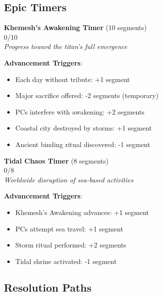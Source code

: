 \documentclass[11pt]{article}
\newcommand{\timersegment}{\textbullet}
\begin{document}
\subsection*{Epic Timers}

\begin{center}
\textbf{Khemesh's Awakening Timer } (10 segments)\\
\fbox{\timersegment\timersegment\timersegment\timersegment\timersegment\timersegment\timersegment\timersegment\timersegment\timersegment} 0/10\\
\textit{Progress toward the titan's full emergence}
\end{center}

\textbf{Advancement Triggers}:
\begin{itemize}[leftmargin=*]
\item Each day without tribute: +1 segment
\item Major sacrifice offered: -2 segments (temporary)
\item PCs interfere with awakening: +2 segments
\item Coastal city destroyed by storms: +1 segment
\item Ancient binding ritual discovered: -1 segment
\end{itemize}

\begin{center}
\textbf{Tidal Chaos Timer } (8 segments)\\
\fbox{\timersegment\timersegment\timersegment\timersegment\timersegment\timersegment\timersegment\timersegment} 0/8\\
\textit{Worldwide disruption of sea-based activities}
\end{center}

\textbf{Advancement Triggers}:
\begin{itemize}[leftmargin=*]
\item Khemesh's Awakening advances: +1 segment
\item PCs attempt sea travel: +1 segment
\item Storm ritual performed: +2 segments
\item Tidal shrine activated: -1 segment
\end{itemize}

\subsection*{Resolution Paths}
\end{document}
